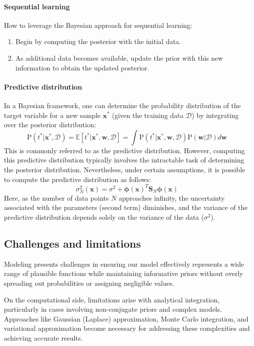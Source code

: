 \paragraph*{Sequential learning}
How to leverage the Bayesian approach for sequential learning:
\begin{enumerate}
    \item Begin by computing the posterior with the initial data.
    \item As additional data becomes available, update the prior with this new information to obtain the updated posterior.
\end{enumerate}

\paragraph*{Predictive distribution}
In a Bayesian framework, one can determine the probability distribution of the target variable for a new sample $\textbf{x}^\ast$ (given the training data $\mathcal{D}$) by integrating over the posterior distribution:
\[\text{P}(t^\ast|\textbf{x}^\ast,\mathcal{D})=\mathbb{E}\left[ t^\ast|\textbf{x}^\ast,\textbf{w},\mathcal{D} \right] = \int\text{P}(t^\ast|\textbf{x}^\ast,\textbf{w},\mathcal{D})\text{P}(\textbf{w}|\mathcal{D})d\textbf{w}\]
This is commonly referred to as the predictive distribution.
However, computing this predictive distribution typically involves the intractable task of determining the posterior distribution.
Nevertheless, under certain assumptions, it is possible to compute the predictive distribution as follows: 
\[\sigma_N^2(\textbf{x})=\sigma^2+\boldsymbol{\phi}(\textbf{x})^T\textbf{S}_N\boldsymbol{\phi}(\textbf{x})\]
Here, as the number of data points $N$ approaches infinity, the uncertainty associated with the parameters (second term) diminishes, and the variance of the predictive distribution depends solely on the variance of the data ($\sigma^2$). 

\subsection{Challenges and limitations}
Modeling presents challenges in ensuring our model effectively represents a wide range of plausible functions while maintaining informative priors without overly spreading out probabilities or assigning negligible values.

On the computational side, limitations arise with analytical integration, particularly in cases involving non-conjugate priors and complex models. 
Approaches like Gaussian (Laplace) approximation, Monte Carlo integration, and variational approximation become necessary for addressing these complexities and achieving accurate results.

